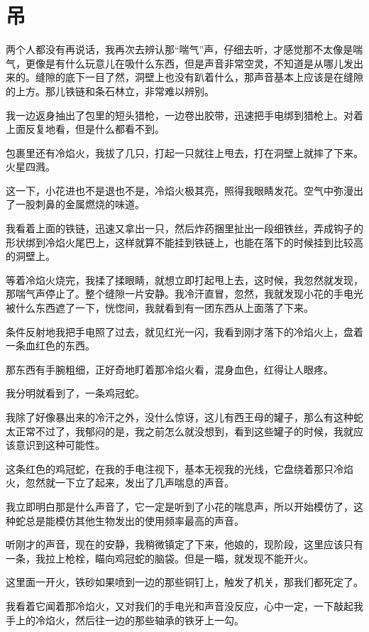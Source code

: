 \chapter{吊}

两个人都没有再说话，我再次去辨认那“喘气”声，仔细去听，才感觉那不太像是喘气，更像是有什么玩意儿在吸什么东西，但是声音非常空灵，不知道是从哪儿发出来的。缝隙的底下一目了然，洞壁上也没有趴着什么，那声音基本上应该是在缝隙的上方。那儿铁链和条石林立，非常难以辨别。

我一边返身抽出了包里的短头猎枪，一边卷出胶带，迅速把手电绑到猎枪上。对着上面反复地看，但是什么都看不到。

包裹里还有冷焰火，我拔了几只，打起一只就往上甩去，打在洞壁上就摔了下来。火星四溅。

这一下，小花进也不是退也不是，冷焰火极其亮，照得我眼睛发花。空气中弥漫出了一股刺鼻的金属燃烧的味道。

我看着上面的铁链，迅速又拿出一只，然后炸药捆里扯出一段细铁丝，弄成钩子的形状绑到冷焰火尾巴上，这样就算不能挂到铁链上，也能在落下的时候挂到比较高的洞壁上。

等着冷焰火烧完，我揉了揉眼睛，就想立即打起甩上去，这时候，我忽然就发现，那喘气声停止了。整个缝隙一片安静。我冷汗直冒，忽然，我就发现小花的手电光被什么东西遮了一下，恍惚间，我就看到有一团东西从上面落了下来。

条件反射地我把手电照了过去，就见红光一闪，我看到刚才落下的冷焰火上，盘着一条血红色的东西。

那东西有手腕粗细，正好奇地盯着那冷焰火看，混身血色，红得让人眼疼。

我分明就看到了，一条鸡冠蛇。

我除了好像暴出来的冷汗之外，没什么惊讶，这儿有西王母的罐子，那么有这种蛇太正常不过了，我郁闷的是，我之前怎么就没想到，看到这些罐子的时候，我就应该意识到这种可能性。

这条红色的鸡冠蛇，在我的手电注视下，基本无视我的光线，它盘绕着那只冷焰火，忽然就一下立了起来，发出了几声喘息的声音。

我立即明白那是什么声音了，它一定是听到了小花的喘息声，所以开始模仿了，这种蛇总是能模仿其他生物发出的使用频率最高的声音。

听刚才的声音，现在的安静，我稍微镇定了下来，他娘的，现阶段，这里应该只有一条，我拉上枪栓，瞄向鸡冠蛇的脑袋。但是一瞄，就发现不能开火。

这里面一开火，铁砂如果喷到一边的那些铜钉上，触发了机关，那我们都死定了。

我看着它闻着那冷焰火，又对我们的手电光和声音没反应，心中一定，一下敲起我手上的冷焰火，然后往一边的那些轴承的铁牙上一勾。

